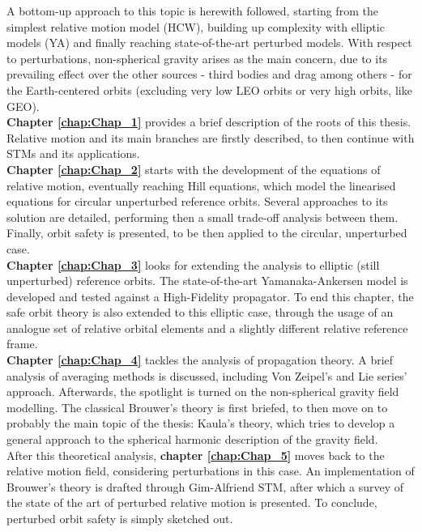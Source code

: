 %
\indent A bottom-up approach to this topic is herewith followed, starting from the simplest relative motion model (HCW), building up complexity with elliptic models (YA) and finally reaching state-of-the-art perturbed models. With respect to perturbations, non-spherical gravity arises as the main concern, due to its prevailing effect over the other sources - third bodies and drag among others - for the Earth-centered orbits (excluding very low LEO orbits or very high orbits, like GEO).\\
%
\indent \textbf{Chapter \ref{chap:Chap_1}} provides a brief description of the roots of this thesis. Relative motion and its main branches are firstly described, to then continue with STMs and its applications.\\
%
\indent \textbf{Chapter \ref{chap:Chap_2}} starts with the development of the equations of relative motion, eventually reaching Hill equations, which model the linearised equations for circular unperturbed reference orbits. Several approaches to its solution are detailed, performing then a small trade-off analysis between them. Finally, orbit safety is presented, to be then applied to the circular, unperturbed case. \\
%
\indent \textbf{Chapter \ref{chap:Chap_3}} looks for extending the analysis to elliptic (still unperturbed) reference orbits. The state-of-the-art Yamanaka-Ankersen model is developed and tested against a High-Fidelity propagator. To end this chapter, the safe orbit theory is also extended to this elliptic case, through the usage of an analogue set of relative orbital elements and a slightly different relative reference frame. \\
%
\indent \textbf{Chapter \ref{chap:Chap_4}} tackles the analysis of propagation theory. A brief analysis of averaging methods is discussed, including Von Zeipel's and Lie series' approach. Afterwards, the spotlight is turned on the non-spherical gravity field modelling. The classical Brouwer's theory is first briefed, to then move on to probably the main topic of the thesis: Kaula's theory, which tries to develop a general approach to the spherical harmonic description of the gravity field.\\
%
\indent After this theoretical analysis, \textbf{chapter \ref{chap:Chap_5}} moves back to the relative motion field, considering perturbations in this case. An implementation of Brouwer's theory is drafted through Gim-Alfriend STM, after which a survey of the state of the art of perturbed relative motion is presented. To conclude, perturbed orbit safety is simply sketched out.\\
